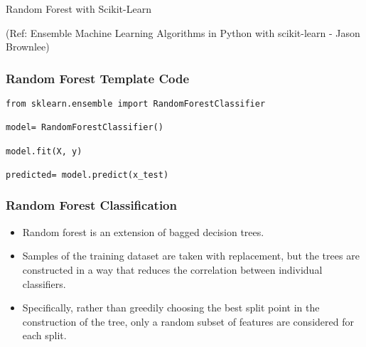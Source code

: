 \begin{frame}[fragile]\frametitle{}
\begin{center}
{\Large Random Forest with Scikit-Learn}

{\tiny (Ref: Ensemble Machine Learning Algorithms in Python with scikit-learn - Jason Brownlee)}
\end{center}
\end{frame}


\begin{frame}[fragile]\frametitle{Random Forest Template Code}
\begin{lstlisting}
from sklearn.ensemble import RandomForestClassifier

model= RandomForestClassifier() 

model.fit(X, y) 

predicted= model.predict(x_test) 
\end{lstlisting}
\end{frame}


\begin{frame}[fragile]\frametitle{Random Forest Classification}

	\begin{itemize}
	\item Random forest is an extension of bagged decision trees.
	\item Samples of the training dataset are taken with replacement, but the trees are constructed in a way that reduces the correlation between individual classifiers. 
	\item Specifically, rather than greedily choosing the best split point in the construction of the tree, only a random subset of features are considered for each split.
	\end{itemize}
	
\end{frame}


